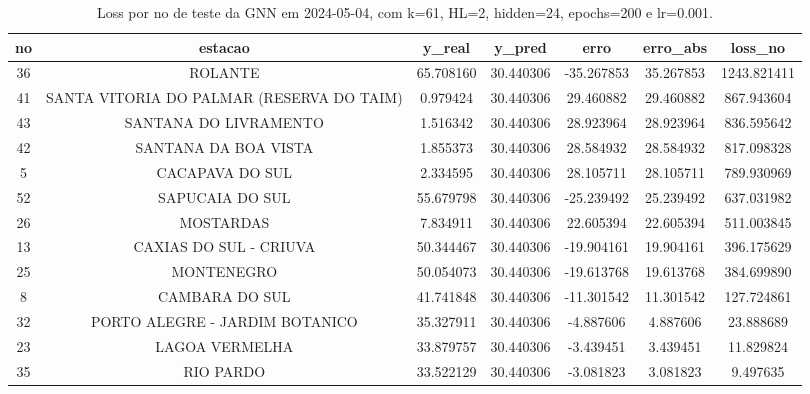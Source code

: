 \begin{table}[h]
\centering
\caption{Loss por no de teste da GNN em 2024-05-04, com k=61, HL=2, hidden=24, epochs=200 e lr=0.001.}
\label{tab:gnn_loss_k61_hl2_h24_e200_d20240504}
\begin{tabular}{ccccccc}
\toprule
no & estacao & y\_real & y\_pred & erro & erro\_abs & loss\_no \\
\midrule
36 & ROLANTE & 65.708160 & 30.440306 & -35.267853 & 35.267853 & 1243.821411 \\
41 & SANTA VITORIA DO PALMAR (RESERVA DO TAIM) & 0.979424 & 30.440306 & 29.460882 & 29.460882 & 867.943604 \\
43 & SANTANA DO LIVRAMENTO & 1.516342 & 30.440306 & 28.923964 & 28.923964 & 836.595642 \\
42 & SANTANA DA BOA VISTA & 1.855373 & 30.440306 & 28.584932 & 28.584932 & 817.098328 \\
5 & CACAPAVA DO SUL & 2.334595 & 30.440306 & 28.105711 & 28.105711 & 789.930969 \\
52 & SAPUCAIA DO SUL & 55.679798 & 30.440306 & -25.239492 & 25.239492 & 637.031982 \\
26 & MOSTARDAS & 7.834911 & 30.440306 & 22.605394 & 22.605394 & 511.003845 \\
13 & CAXIAS DO SUL - CRIUVA & 50.344467 & 30.440306 & -19.904161 & 19.904161 & 396.175629 \\
25 & MONTENEGRO & 50.054073 & 30.440306 & -19.613768 & 19.613768 & 384.699890 \\
8 & CAMBARA DO SUL & 41.741848 & 30.440306 & -11.301542 & 11.301542 & 127.724861 \\
32 & PORTO ALEGRE - JARDIM BOTANICO & 35.327911 & 30.440306 & -4.887606 & 4.887606 & 23.888689 \\
23 & LAGOA VERMELHA & 33.879757 & 30.440306 & -3.439451 & 3.439451 & 11.829824 \\
35 & RIO PARDO & 33.522129 & 30.440306 & -3.081823 & 3.081823 & 9.497635 \\
\bottomrule
\end{tabular}
\end{table}
